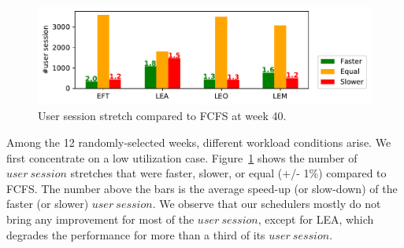 \documentclass[conference]{IEEEtran}
\newcommand{\us}{\ensuremath{\mathit{user~session}}\xspace}
\newcommand{\uss}{\ensuremath{\mathit{user~sessions}}\xspace}
\begin{document}
\begin{figure}[t]\centering\includegraphics[width=1\linewidth]{../MBSS/plot/Boxplot/byuser/small_hist_stretch_10-03-10-09.pdf}\caption{User session stretch compared to FCFS at week 40.}\label{smallhist.40}\end{figure}

Among the 12 randomly-selected weeks, different workload conditions
arise. We first concentrate on a low utilization case.
Figure~\ref{smallhist.40} shows the number of \us stretches that were faster, slower, or equal (+/- 1\%) compared to FCFS.
The number above the bars is the average speed-up (or slow-down) of the faster (or slower) \us.
We observe that our schedulers mostly do not bring any improvement for most of the \us, except for LEA, which degrades the performance for more than a third of its \us.

\end{document}
